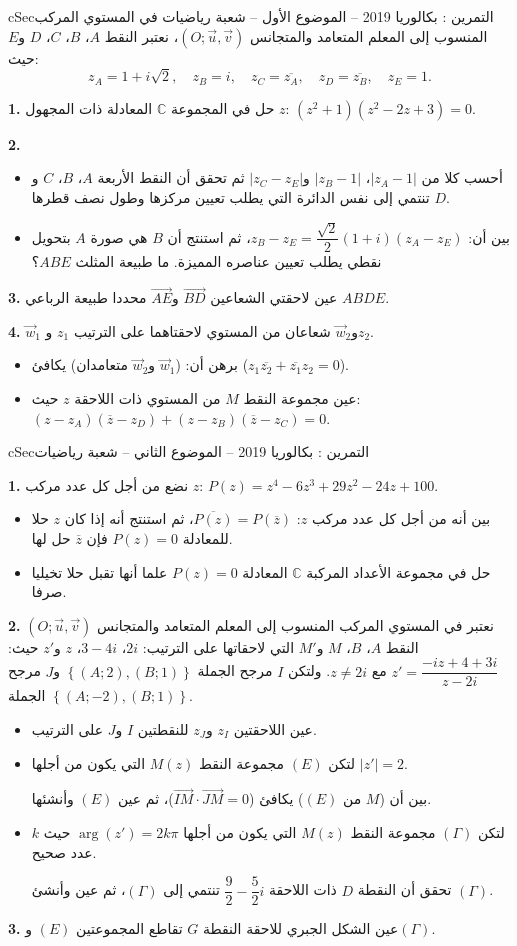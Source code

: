 \documentclass[12pt,a4paper]{article}
\newenvironment{BOX}[2]{\begin{otherlanguage}{english}\begin{arbox}{#1}{#2}}{\end{arbox}\end{otherlanguage}}
\newcounter{exo}
\newenvironment{tamrin}[1]{\stepcounter{exo}\begin{BOX}{cSec}{التمرين \theexo: #1}}{\end{BOX}}
\newenvironment{sq}{\begin{itemize}[leftmargin=2.4em,itemsep=3pt]}{\end{itemize}}
\newcommand{\qa}{\item[(أ)]}\newcommand{\qb}{\item[(ب)]}\newcommand{\qc}{\item[(جـ)]}\newcommand{\qd}{\item[(د)]}\newcommand{\qe}{\item[(هـ)]}
\newcommand{\QQ}[1]{\par\smallskip\textbf{#1.} }
\begin{document}
\begin{tamrin}{بكالوريا 2019 -- الموضوع الأول -- شعبة رياضيات}
في المستوي المركب المنسوب إلى المعلم المتعامد والمتجانس $\left(O;\vec u,\vec v\right)$، نعتبر النقط $A$، $B$، $C$، $D$ و$E$ حيث:
\[z_A=1+i\sqrt2,\quad z_B=i,\quad z_C=\overline{z_A},\quad z_D=\overline{z_B},\quad z_E=1.\]
\QQ{1} حل في المجموعة $\mathbb{C}$ المعادلة ذات المجهول $z$: $\left(z^2+1\right)\left(z^2-2z+3\right)=0$.

\QQ{2}
\begin{sq}
\qa أحسب كلا من $\left|z_A-1\right|$، $\left|z_B-1\right|$ و$\left|z_C-z_E\right|$ ثم تحقق أن النقط الأربعة $A$، $B$، $C$ و$D$ تنتمي إلى نفس الدائرة التي يطلب تعيين مركزها وطول نصف قطرها.
\qb بين أن: $z_B-z_E=\dfrac{\sqrt2}{2}(1+i)\left(z_A-z_E\right)$، ثم استنتج أن $B$ هي صورة $A$ بتحويل نقطي يطلب تعيين عناصره المميزة. ما طبيعة المثلث $ABE$؟
\end{sq}
\QQ{3} عين لاحقتي الشعاعين $\overrightarrow{BD}$ و$\overrightarrow{AE}$ محددا طبيعة الرباعي $ABDE$.

\QQ{4} $\vec w_1$ و$\vec w_2$ شعاعان من المستوي لاحقتاهما على الترتيب $z_1$ و$z_2$.
\begin{sq}
\qa برهن أن: ($\vec w_1$ و$\vec w_2$ متعامدان) يكافئ ($z_1\overline{z_2}+\overline{z_1}z_2=0$).
\qb عين مجموعة النقط $M$ من المستوي ذات اللاحقة $z$ حيث: $\left(z-z_A\right)\left(\overline{z}-z_D\right)+\left(z-z_B\right)\left(\overline{z}-z_C\right)=0$.
\end{sq}
\end{tamrin}

\begin{tamrin}{بكالوريا 2019 -- الموضوع الثاني -- شعبة رياضيات}
\QQ{1} نضع من أجل كل عدد مركب $z$: $P(z)=z^4-6z^3+29z^2-24z+100$.
\begin{sq}
\qa بين أنه من أجل كل عدد مركب $z$: $\overline{P(z)}=P\left(\overline{z}\right)$، ثم استنتج أنه إذا كان $z$ حلا للمعادلة $P(z)=0$ فإن $\overline{z}$ حل لها.
\qb حل في مجموعة الأعداد المركبة $\mathbb{C}$ المعادلة $P(z)=0$ علما أنها تقبل حلا تخيليا صرفا.
\end{sq}
\QQ{2} نعتبر في المستوي المركب المنسوب إلى المعلم المتعامد والمتجانس $\left(O;\vec u,\vec v\right)$ النقط $A$، $B$، $M$ و$M'$ التي لاحقاتها على الترتيب: $2i$، $3-4i$، $z$ و$z'$ حيث: $z'=\dfrac{-iz+4+3i}{z-2i}$ مع $z\neq2i$.
ولتكن $I$ مرجح الجملة $\left\{(A;2),(B;1)\right\}$ و$J$ مرجح الجملة $\left\{(A;-2),(B;1)\right\}$.
\begin{sq}
\qa عين اللاحقتين $z_I$ و$z_J$ للنقطتين $I$ و$J$ على الترتيب.
\qb لتكن $(E)$ مجموعة النقط $M(z)$ التي يكون من أجلها $|z'|=2$.

بين أن ($M$ من $(E)$) يكافئ ($\overrightarrow{IM}\cdot\overrightarrow{JM}=0$)، ثم عين $(E)$ وأنشئها.
\qc لتكن $(\Gamma)$ مجموعة النقط $M(z)$ التي يكون من أجلها $\arg\left(z'\right)=2k\pi$ حيث $k$ عدد صحيح.

تحقق أن النقطة $D$ ذات اللاحقة $\dfrac92-\dfrac52i$ تنتمي إلى $(\Gamma)$، ثم عين وأنشئ $(\Gamma)$.
\end{sq}
\QQ{3} عين الشكل الجبري للاحقة النقطة $G$ تقاطع المجموعتين $(E)$ و$(\Gamma)$.
\end{tamrin}
\end{document}
